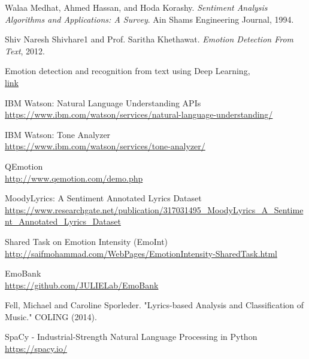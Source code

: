 







\begin{thebibliography}{9}
Walaa Medhat, Ahmed Hassan, and Hoda Korashy. \textit{Sentiment Analysis Algorithms and Applications: A Survey}. Ain Shams Engineering Journal, 1994.
 
Shiv Naresh Shivhare1 and Prof. Saritha Khethawat. \textit{Emotion Detection From Text}, 2012.

 
Emotion detection and recognition from text using Deep Learning,
\\\href{https://www.microsoft.com/developerblog/2015/11/29/emotion-detection-and-recognition-from-text-using-deep-learning/}{link}

 
IBM Watson: Natural Language Understanding APIs
\\\footnotesize \url{https://www.ibm.com/watson/services/natural-language-understanding/}

IBM Watson: Tone Analyzer
\\\footnotesize \url{https://www.ibm.com/watson/services/tone-analyzer/}

QEmotion
\\\footnotesize \url{http://www.qemotion.com/demo.php}

MoodyLyrics: A Sentiment Annotated Lyrics Dataset
\\\footnotesize \url{https://www.researchgate.net/publication/317031495_MoodyLyrics_A_Sentiment_Annotated_Lyrics_Dataset}

Shared Task on Emotion Intensity (EmoInt)
\\\footnotesize \url{http://saifmohammad.com/WebPages/EmotionIntensity-SharedTask.html}

EmoBank
\\\footnotesize \url{https://github.com/JULIELab/EmoBank}

Fell, Michael and Caroline Sporleder. "Lyrics-based Analysis and Classification of Music." COLING (2014).

SpaCy - Industrial-Strength Natural Language Processing in Python
\\\footnotesize \url{https://spacy.io/}


\end{thebibliography}
